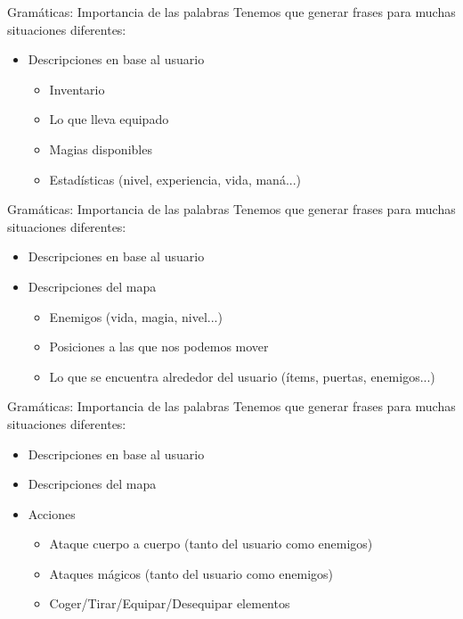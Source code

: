 
\begin{frame}[t, fragile]{Gramáticas: Importancia de las palabras}
	Tenemos que generar frases para muchas situaciones diferentes:
	\begin{itemize}
		\item<+-| alert@+> Descripciones en base al usuario
			\begin{itemize}
				\item Inventario
				\item Lo que lleva equipado
				\item Magias disponibles
				\item Estadísticas (nivel, experiencia, vida, maná...)
			\end{itemize}
	\end{itemize}
\end{frame}

\begin{frame}[t, fragile]{Gramáticas: Importancia de las palabras}
	Tenemos que generar frases para muchas situaciones diferentes:
	\begin{itemize}
		\item Descripciones en base al usuario
		\item<+-| alert@+> Descripciones del mapa
			\begin{itemize}
				\item Enemigos (vida, magia, nivel...)
				\item Posiciones a las que nos podemos mover
				\item Lo que se encuentra alrededor del usuario (ítems, puertas, enemigos...)
			\end{itemize}
	\end{itemize}
\end{frame}

\begin{frame}[t, fragile]{Gramáticas: Importancia de las palabras}
	Tenemos que generar frases para muchas situaciones diferentes:
	\begin{itemize}
		\item Descripciones en base al usuario
		\item Descripciones del mapa
		\item<+-| alert@+> Acciones
			\begin{itemize}
				\item Ataque cuerpo a cuerpo (tanto del usuario como enemigos)
				\item Ataques mágicos (tanto del usuario como enemigos)
				\item Coger/Tirar/Equipar/Desequipar elementos
			\end{itemize}
	\end{itemize}
\end{frame}

